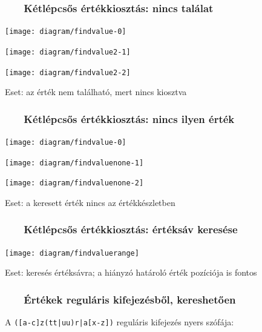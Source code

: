 \documentclass[
    aspectratio=169,
]{beamer}
\newcommand{\slidetitle}[2]{\frametitle{{\small #1 ~ \ding{226} ~ } \normalsize \textbf{#2} }}
\begin{document}
\begin{frame}
    \slidetitle{\sectionshorttitle}{Kétlépcsős értékkiosztás: nincs találat}
    
    \centering
    
    \begin{overprint}
        \centerline{\texttt{[image: diagram/findvalue-0]}}
        \centerline{\texttt{[image: diagram/findvalue2-1]}}
        \centerline{\texttt{[image: diagram/findvalue2-2]}}
    \end{overprint}
    
    \vspace{0.7cm}
    
    Eset: az érték nem található, mert nincs kiosztva
\end{frame}

\begin{frame}
    \slidetitle{\sectionshorttitle}{Kétlépcsős értékkiosztás: nincs ilyen érték}
    
    \centering
    
    \begin{overprint}
        \centerline{\texttt{[image: diagram/findvalue-0]}}
        \centerline{\texttt{[image: diagram/findvaluenone-1]}}
        \centerline{\texttt{[image: diagram/findvaluenone-2]}}
    \end{overprint}
    
    \vspace{0.7cm}
    
    Eset: a keresett érték nincs az értékkészletben
\end{frame}

\begin{frame}
    \slidetitle{\sectionshorttitle}{Kétlépcsős értékkiosztás: értéksáv keresése}
    
    \centering
    
    \texttt{[image: diagram/findvaluerange]}
    
    \vspace{0.7cm}
    
    Eset: keresés értéksávra; a hiányzó határoló érték pozíciója is fontos
\end{frame}

\begin{frame}[t]
    \slidetitle{\sectionshorttitle}{Értékek reguláris kifejezésből, kereshetően}
    \centering
    {\Large A \texttt{\colorbox{Goldenrod!10}{([a-c]z(tt|uu)r|a[x-z])}} reguláris kifejezés {\color{red}nyers} szófája:}
    
    \vspace{1.2cm}
    
    
\end{frame}
\end{document}
